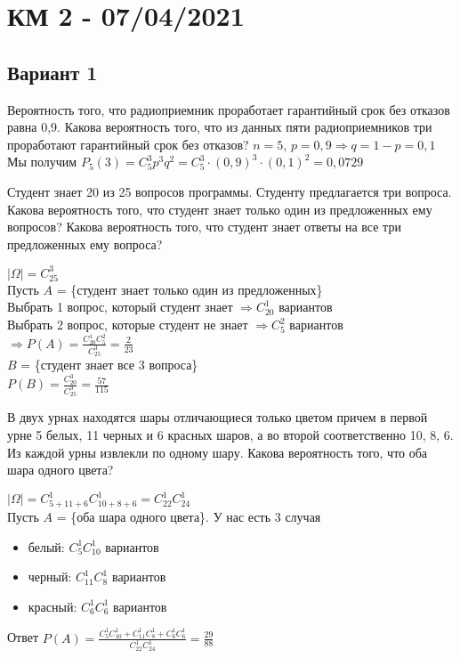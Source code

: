 \section*{КМ 2 - 07/04/2021}
\subsection*{Вариант 1}
\begin{exercise}[1] Вероятность того, что радиоприемник проработает гарантийный срок без отказов равна 0,9. Какова вероятность того, что из данных пяти радиоприемников три проработают гарантийный срок без отказов?
	$n=5$, $p=0,9 \Rightarrow q = 1-p=0,1$ \\ Мы получим $P_5(3) = C^3_5 p^3 q^2 = C^3_5 \cdot (0,9)^3 \cdot (0,1)^2 = 0,0729$
\end{exercise}
\begin{exercise}[2] Студент знает 20 из 25 вопросов программы. Студенту предлагается три вопроса. Какова вероятность того, что студент знает только один из предложенных ему вопросов? Какова вероятность того, что студент знает ответы на все три предложенных ему вопроса?
	
	$| \Omega | = C^3_{25}$ \\ Пусть $A$ = \{студент знает только один из предложенных\} \\ Выбрать 1 вопрос, который студент знает $\Rightarrow C^1_{20}$ вариантов \\ Выбрать 2 вопрос, которые студент не знает $\Rightarrow C^2_5$ вариантов \\ $\Rightarrow P(A) = \frac{C^1_{20} C^2_5}{C^3_{25}} = \frac{2}{23}$ \\ $B$ = \{студент знает все 3 вопроса\} \\ $P(B) = \frac{C^3_{20}}{C^3_{25}} = \frac{57}{115}$
\end{exercise}

\begin{exercise}[3] В двух урнах находятся шары отличающиеся только цветом причем в первой урне 5 белых, 11 черных и 6 красных шаров, а во второй соответственно 10, 8, 6. Из каждой урны извлекли по одному шару. Какова вероятность того, что оба шара одного цвета?
	
	$|\Omega| = C^1_{5+11+6} C^1_{10 + 8 + 6} = C^1_{22} C^1_{24}$ \\ Пусть $A$ = \{оба шара одного цвета\}. У нас есть 3 случая
	\begin{itemize}
		\item белый: $C^1_5 C^1_{10}$ вариантов
		\item черный: $C^1_{11} C^1_8$ вариантов
		\item красный: $C^1_6 C^1_6$ вариантов
	\end{itemize}
	Ответ $P(A) = \frac{C^1_5 C^1_{10} + C^1_{11} C^1_8 + C^1_6 C^1_6}{C^1_{22} C^1_{24}} = \frac{29}{88}$
\end{exercise}

